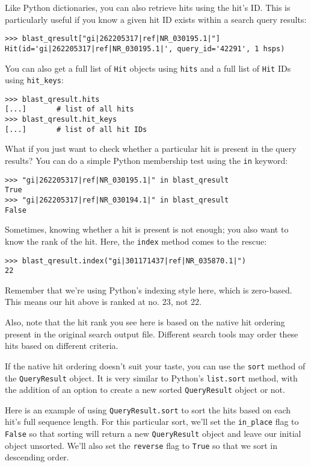 Like Python dictionaries, you can also retrieve hits using the hit's ID. This is
particularly useful if you know a given hit ID exists within a search query
results:

\begin{verbatim}
>>> blast_qresult["gi|262205317|ref|NR_030195.1|"]
Hit(id='gi|262205317|ref|NR_030195.1|', query_id='42291', 1 hsps)
\end{verbatim}

You can also get a full list of \verb|Hit| objects using \verb|hits| and a full
list of \verb|Hit| IDs using \verb|hit_keys|:

\begin{verbatim}
>>> blast_qresult.hits
[...]       # list of all hits
>>> blast_qresult.hit_keys
[...]       # list of all hit IDs
\end{verbatim}

What if you just want to check whether a particular hit is present in the query
results? You can do a simple Python membership test using the \verb|in| keyword:

\begin{verbatim}
>>> "gi|262205317|ref|NR_030195.1|" in blast_qresult
True
>>> "gi|262205317|ref|NR_030194.1|" in blast_qresult
False
\end{verbatim}

Sometimes, knowing whether a hit is present is not enough; you also want to know
the rank of the hit. Here, the \verb|index| method comes to the rescue:

\begin{verbatim}
>>> blast_qresult.index("gi|301171437|ref|NR_035870.1|")
22
\end{verbatim}

Remember that we're using Python's indexing style here, which is zero-based.
This means our hit above is ranked at no. 23, not 22.

Also, note that the hit rank you see here is based on the native hit ordering
present in the original search output file. Different search tools may order
these hits based on different criteria.

If the native hit ordering doesn't suit your taste, you can use the \verb|sort|
method of the \verb|QueryResult| object. It is very similar to Python's
\verb|list.sort| method, with the addition of an option to create a new sorted
\verb|QueryResult| object or not.

Here is an example of using \verb|QueryResult.sort| to sort the hits based on
each hit's full sequence length. For this particular sort, we'll set the
\verb|in_place| flag to \verb|False| so that sorting will return a new
\verb|QueryResult| object and leave our initial object unsorted. We'll also set
the \verb|reverse| flag to \verb|True| so that we sort in descending order.

